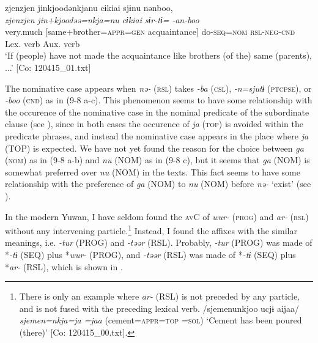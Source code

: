 \ex \label{ex:9.8c} %
     \gllll     zjenzjen  jinkjoodənkjanu  cɨkiai  sjɨnu                                           nənboo,\\
      \textit{zjenzjen}  \textit{jin+kjoodəə=nkja=nu}  \textit{cɨkiai}  \textit{sɨr-tɨ=}          \textit{-an-boo}\\
      very.much  [same+brother=\textsc{appr}=\textsc{gen}  acquaintance]  do-\textsc{seq}=\textsc{nom}                                  \textsc{rsl}-\textsc{neg}-\textsc{cnd}\\
        [Complement]    Lex. verb                                                                   Aux. verb\\
      \glt       ‘If (people) have not made the acquaintance like brothers (of the) same (parents), ...’ [Co: 120415\_01.txt]
     \z
\z

The nominative case appears when \textit{nə-} (\textsc{rsl}) takes \textit{-ba} (\textsc{csl}), \textit{{}-n=sjutɨ} (\textsc{ptcpse}), or \textit{{}-boo} (\textsc{cnd}) as in (9-8 a-c). This phenomenon seems to have some relationship with the occurence of the nominative case in the nominal predicate of the subordinate clause (see ), since in both cases the occurence of \textit{ja} (\textsc{top}) is avoided within the predicate phrases, and instead the nominative case appears in the place where \textit{ja} (TOP) is expected. We have not yet found the reason for the choice between \textit{ga} (\textsc{nom}) as in (9-8 a-b) and \textit{nu} (NOM) as in (9-8 c), but it seems that \textit{ga} (NOM) is somewhat preferred over \textit{nu} (NOM) in the texts. This fact seems to have some relationship with the preference of \textit{ga} (NOM) to \textit{nu} (NOM) before \textit{nə-} ‘exist’ (see ).

In the modern Yuwan, I have seldom found the \textsc{av}C of \textit{wur-} (\textsc{prog}) and \textit{ar-} (\textsc{rsl}) without any intervening particle.\footnote{There is only an example where \textit{ar-} (RSL) is not preceded by any particle, and is not fused with the preceding lexical verb. /sjemenunkjoo ucjɨ aijaa/ \textit{sjemen=nkja=ja} \textit{} \textit{=jaa} (cement=\textsc{appr}=\textsc{top}  =\textsc{sol}) ‘Cement has been poured (there)’ [Co: 120415\_00.txt].} Instead, I found the affixes with the similar meanings, i.e. \textit{{}-tur} (PROG) and \textit{{}-təər} (RSL). Probably, \textit{{}-tur} (PROG) was made of *\textit{{}-tɨ} (SEQ) plus *\textit{wur-} (PROG), and \textit{{}-təər} (RSL) was made of *\textit{{}-tɨ} (SEQ) plus *\textit{ar-} (RSL), which is shown in .

